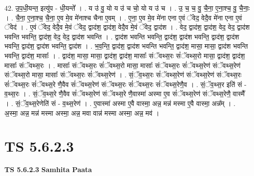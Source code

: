 \documentclass[17pt]{extarticle}
\begin{document}
42. उ॒प॒धी॒यन्त॒ इत्यु॑प - धी॒यन्ते᳚ । . य उ॑ वु॒ यो य उ॑ च चो॒ यो य उ॑ च । . उ॒ च॒ च॒ वु॒ चै॒ना॒ ए॒ना॒श्च॒ वु॒ चै॒नाः॒ । . चै॒ना॒ ए॒ना॒श्च॒ चै॒ना॒ ए॒व मे॒व मे॑नाश्च चैना ए॒वम् । . ए॒ना॒ ए॒व मे॒व मे॑ना एना ए॒वं ॅवेद॒ वेदै॒व मे॑ना एना ए॒वं ॅवेद॑ । . ए॒वं ॅवेद॒ वेदै॒व मे॒वं ॅवेद॒ द्वाद॑श॒ द्वाद॑श॒ वेदै॒व मे॒वं ॅवेद॒ द्वाद॑श । . वेद॒ द्वाद॑श॒ द्वाद॑श॒ वेद॒ वेद॒ द्वाद॑श भवन्ति भवन्ति॒ द्वाद॑श॒ वेद॒ वेद॒ द्वाद॑श भवन्ति । . द्वाद॑श भवन्ति भवन्ति॒ द्वाद॑श॒ द्वाद॑श भवन्ति॒ द्वाद॑श॒ द्वाद॑श भवन्ति॒ द्वाद॑श॒ द्वाद॑श भवन्ति॒ द्वाद॑श । . भ॒व॒न्ति॒ द्वाद॑श॒ द्वाद॑श भवन्ति भवन्ति॒ द्वाद॑श॒ मासा॒ मासा॒ द्वाद॑श भवन्ति भवन्ति॒ द्वाद॑श॒ मासाः᳚ । . द्वाद॑श॒ मासा॒ मासा॒ द्वाद॑श॒ द्वाद॑श॒ मासाः᳚ संॅवथ्स॒रः सं॑ॅवथ्स॒रो मासा॒ द्वाद॑श॒ द्वाद॑श॒ मासाः᳚ संॅवथ्स॒रः । . मासाः᳚ संॅवथ्स॒रः सं॑ॅवथ्स॒रो मासा॒ मासाः᳚ संॅवथ्स॒रः सं॑ॅवथ्स॒रेण॑ संॅवथ्स॒रेण॑ संॅवथ्स॒रो मासा॒ मासाः᳚ संॅवथ्स॒रः सं॑ॅवथ्स॒रेण॑ । . सं॒ॅव॒थ्स॒रः सं॑ॅवथ्स॒रेण॑ संॅवथ्स॒रेण॑ संॅवथ्स॒रः सं॑ॅवथ्स॒रः सं॑ॅवथ्स॒रे णै॒वैव सं॑ॅवथ्स॒रेण॑ संॅवथ्स॒रः सं॑ॅवथ्स॒रः सं॑ॅवथ्स॒रेणै॒व । . सं॒ॅव॒थ्स॒र इति॑ सं - व॒थ्स॒रः । . सं॒ॅव॒थ्स॒रे णै॒वैव सं॑ॅवथ्स॒रेण॑ संॅवथ्स॒रे णै॒वास्मा॑ अस्मा ए॒व सं॑ॅवथ्स॒रेण॑ संॅवथ्स॒रेणै॒ वास्मै᳚ । . सं॒ॅव॒थ्स॒रेणेति॑ सं - व॒थ्स॒रेण॑ । . ए॒वास्मा॑ अस्मा ए॒वै वास्मा॒ अन्न॒ मन्न॑ मस्मा ए॒वै वास्मा॒ अन्न᳚म् । . अ॒स्मा॒ अन्न॒ मन्न॑ मस्मा अस्मा॒ अन्न॒ मवा वान्न॑ मस्मा अस्मा॒ अन्न॒ मव॑ । \newline
\pagebreak
{}

\section{ TS 5.6.2.3 }

\textbf{TS 5.6.2.3 } \newline
\textbf{Samhita Paata} \newline
\end{document}
